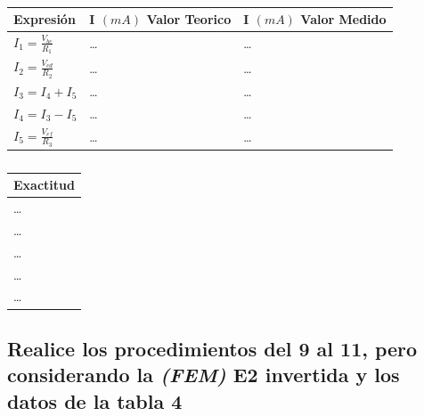 \documentclass[twocolumn, 12pt]{article}
\begin{document}
\begin{table}[H]
    \captionsetup{justification=centering}
    \centering

    \begin{tabularx}{0.9\linewidth}{|>{\centering\arraybackslash}X|>{\centering\arraybackslash}X|>{\centering\arraybackslash}X|}
        \hline
        Expresión                  & I $(mA)$ Valor Teorico & I $(mA)$ Valor Medido \\\hline
        $I_1 = \frac{V_{bc}}{R_1}$ & \dots                  & \dots                 \\ \hline
        $I_2 = \frac{V_{cd}}{R_2}$ & \dots                  & \dots                 \\ \hline
        $I_3 = I_4 + I_5$          & \dots                  & \dots                 \\ \hline
        $I_4 = I_3 - I_5$          & \dots                  & \dots                 \\ \hline
        $I_5 = \frac{V_{ef}}{R_3}$ & \dots                  & \dots                 \\ \hline
    \end{tabularx}

    \vspace{.2cm}

    \begin{tabularx}{0.9\linewidth}{|>{\centering\arraybackslash}X|}
        \hline
        Exactitud \\\hline
        \dots     \\\hline
        \dots     \\\hline
        \dots     \\\hline
        \dots     \\\hline
        \dots     \\\hline
    \end{tabularx}

    \caption{}

    \label{tab:analisisDatos__11}
\end{table}

\subsection{Realice los procedimientos del 9 al 11, pero considerando la \textit{(FEM)} E2 invertida y los datos de la tabla 4}
\end{document}
